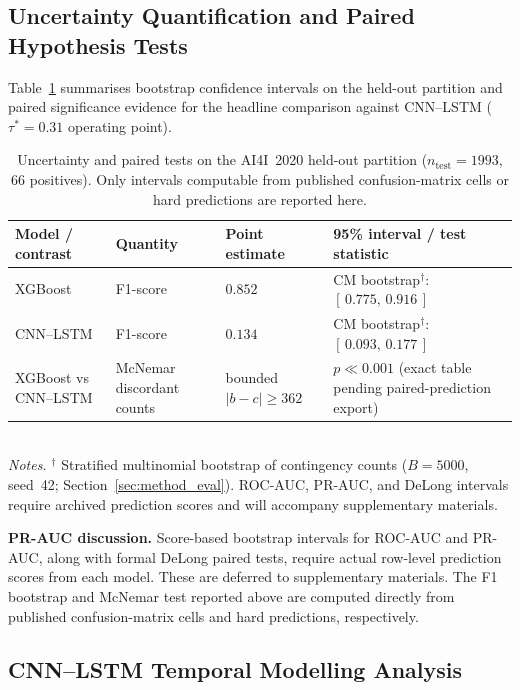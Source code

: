 \documentclass[sensors,article,submit,pdftex,moreauthors]{Definitions/mdpi}
\newcommand{\mdpitablefont}{\footnotesize}
\begin{document}
\subsection{Uncertainty Quantification and Paired Hypothesis Tests}
\label{sec:stats_results}

Table~\ref{tab:stats_infer} summarises bootstrap confidence intervals on
the held-out partition and paired significance evidence for the headline
comparison against CNN--LSTM ($\tau^*=0.31$ operating point).

\begin{table}[H]
\caption{Uncertainty and paired tests on the AI4I~2020 held-out partition
($n_{\mathrm{test}}=1993$, 66 positives).  Only intervals computable from
published confusion-matrix cells or hard predictions are reported here.\label{tab:stats_infer}}
\centering
\mdpitablefont
\setlength{\tabcolsep}{4pt}
\begin{tabular}{llll}
\toprule
\textbf{Model / contrast} & \textbf{Quantity} &
\textbf{Point estimate} & \textbf{95\% interval / test statistic} \\
\midrule
XGBoost &
  F1-score & $0.852$ &
  CM bootstrap$^\dagger$: $[\,0.775,\,0.916\,]$ \\
\midrule
CNN--LSTM &
  F1-score & $0.134$ &
  CM bootstrap$^\dagger$: $[\,0.093,\,0.177\,]$ \\
\midrule
XGBoost vs CNN--LSTM &
  McNemar discordant counts & bounded $|b-c| \geq 362$ &
  $p \ll 0.001$ (exact table pending paired-prediction export) \\
\bottomrule
\end{tabular}
\\[4pt]
\footnotesize{\textit{Notes.}
$^\dagger$ Stratified multinomial bootstrap of contingency counts ($B{=}5000$, seed~42; Section~\ref{sec:method_eval}).\newline
ROC-AUC, PR-AUC, and DeLong intervals require archived prediction scores and will accompany supplementary materials.}
\end{table}

\noindent
\textbf{PR-AUC discussion.}
Score-based bootstrap intervals for ROC-AUC and PR-AUC, along with formal
DeLong paired tests, require actual row-level prediction scores from each
model.  These are deferred to supplementary materials.  The F1 bootstrap and
McNemar test reported above are computed directly from published
confusion-matrix cells and hard predictions, respectively.

\subsection{CNN--LSTM Temporal Modelling Analysis}
\label{sec:discuss_cnnlstm}
\end{document}
